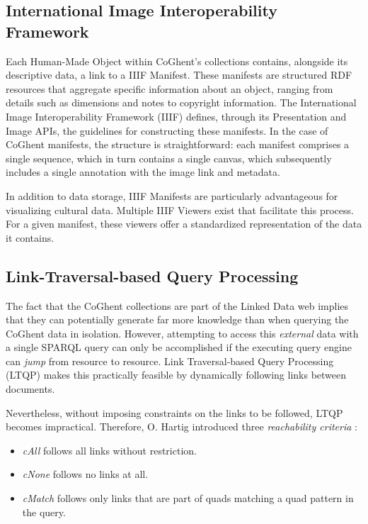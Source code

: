 \documentclass[conference]{IEEEtran}
\begin{document}
\subsection{International Image Interoperability Framework}
Each Human-Made Object within CoGhent's collections contains, alongside its descriptive data, a link to a IIIF Manifest. These manifests are structured RDF resources that aggregate specific information about an object, ranging from details such as dimensions and notes to copyright information. The International Image Interoperability Framework (IIIF) defines, through its Presentation and Image APIs, the guidelines for constructing these manifests. In the case of CoGhent manifests, the structure is straightforward: each manifest comprises a single sequence, which in turn contains a single canvas, which subsequently includes a single annotation with the image link and metadata. \cite{appleby2017presentation} \cite{emanuel2018stitching} \cite{floreverk2022coghent}

In addition to data storage, IIIF Manifests are particularly advantageous for visualizing cultural data. Multiple IIIF Viewers exist that facilitate this process. For a given manifest, these viewers offer a standardized representation of the data it contains. \cite{snydman2015international}

\subsection{Link-Traversal-based Query Processing}
The fact that the CoGhent collections are part of the Linked Data web implies that they can potentially generate far more knowledge than when querying the CoGhent data in isolation. However, attempting to access this \textit{external} data with a single SPARQL query can only be accomplished if the executing query engine can \textit{jump} from resource to resource. Link Traversal-based Query Processing (LTQP) makes this practically feasible by dynamically following links between documents. \cite{taelman2023ltqp}

Nevertheless, without imposing constraints on the links to be followed, LTQP becomes impractical. Therefore, O. Hartig introduced three \textit{reachability criteria} \cite{hartig2012foundations}:
\begin{itemize}
    \item \textit{cAll} follows all links without restriction.
    \item \textit{cNone} follows no links at all.
    \item \textit{cMatch} follows only links that are part of quads matching a quad pattern in the query.
\end{itemize}
\end{document}
